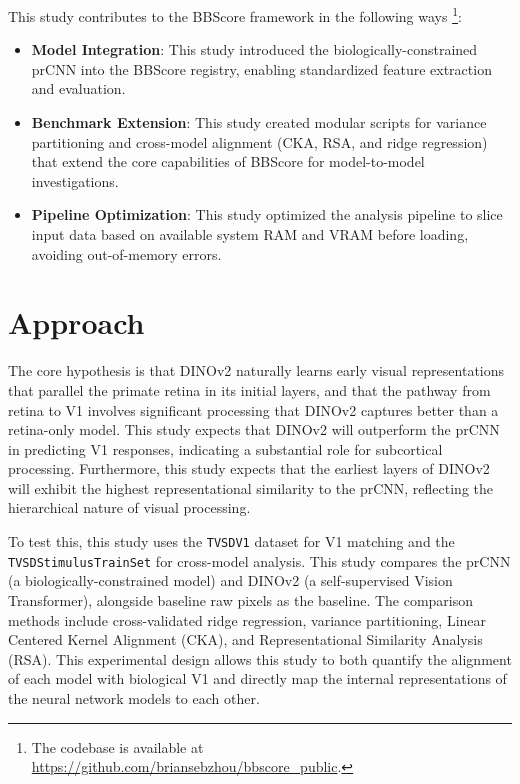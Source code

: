 \documentclass{article}
\begin{document}
This study contributes to the BBScore framework \cite{noauthor_neuroailabbbscore_public_2026}
in the following ways
\footnote{The codebase is available at \url{https://github.com/briansebzhou/bbscore_public}.}:
\begin{itemize}
    \item \textbf{Model Integration}: 
    This study introduced the biologically-constrained prCNN into the BBScore registry, 
    enabling standardized feature extraction and evaluation.
    \item \textbf{Benchmark Extension}: 
    This study created modular scripts for variance partitioning and cross-model alignment (CKA, RSA, and ridge regression) 
    that extend the core capabilities of BBScore for model-to-model investigations.
    \item \textbf{Pipeline Optimization}:
    This study optimized the analysis pipeline to slice input data based on available 
    system RAM and VRAM before loading, avoiding out-of-memory errors.
\end{itemize}

\section{Approach}
The core hypothesis is that DINOv2 naturally learns early visual
representations that parallel the primate retina in its initial
layers, and that the pathway from retina to V1 involves
significant processing that DINOv2 captures better than a
retina-only model. This study expects that DINOv2 will outperform the prCNN
in predicting V1 responses, indicating a substantial role for
subcortical processing. Furthermore, this study expects that the earliest
layers of DINOv2 will exhibit the highest representational
similarity to the prCNN, reflecting the hierarchical nature of
visual processing.

To test this, this study uses the \texttt{TVSDV1} dataset for V1 matching and the
\texttt{TVSDStimulusTrainSet} for cross-model analysis. This study compares the
prCNN (a biologically-constrained model) and DINOv2 (a
self-supervised Vision Transformer), alongside baseline raw pixels as the baseline.
The comparison methods include cross-validated ridge regression, variance
partitioning, Linear Centered Kernel Alignment (CKA), and
Representational Similarity Analysis (RSA). This experimental design
allows this study to both quantify the alignment of each model with
biological V1 and directly map the internal representations of the
neural network models to each other.
\end{document}
